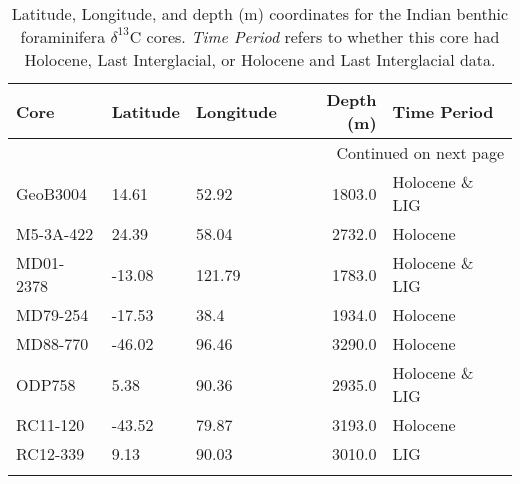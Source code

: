 \begin{longtable}{lllrl}

      Core & Latitude & Longitude &  Depth (m) &     Time Period \\

\endhead

\multicolumn{5}{r}{{Continued on next page}} \\

\endfoot


\endlastfoot
  GeoB3004 &    14.61 &     52.92 &     1803.0 &  Holocene \& LIG \\
 M5-3A-422 &    24.39 &     58.04 &     2732.0 &        Holocene \\
 MD01-2378 &   -13.08 &    121.79 &     1783.0 &  Holocene \& LIG \\
  MD79-254 &   -17.53 &      38.4 &     1934.0 &        Holocene \\
  MD88-770 &   -46.02 &     96.46 &     3290.0 &        Holocene \\
    ODP758 &     5.38 &     90.36 &     2935.0 &  Holocene \& LIG \\
  RC11-120 &   -43.52 &     79.87 &     3193.0 &        Holocene \\
  RC12-339 &     9.13 &     90.03 &     3010.0 &             LIG \\
\caption{Latitude, Longitude, and depth (m) coordinates for the Indian benthic foraminifera $\delta^{13}$C cores. \textit{Time Period} refers to whether this core had Holocene, Last Interglacial, or Holocene and Last Interglacial data.}\end{longtable}
